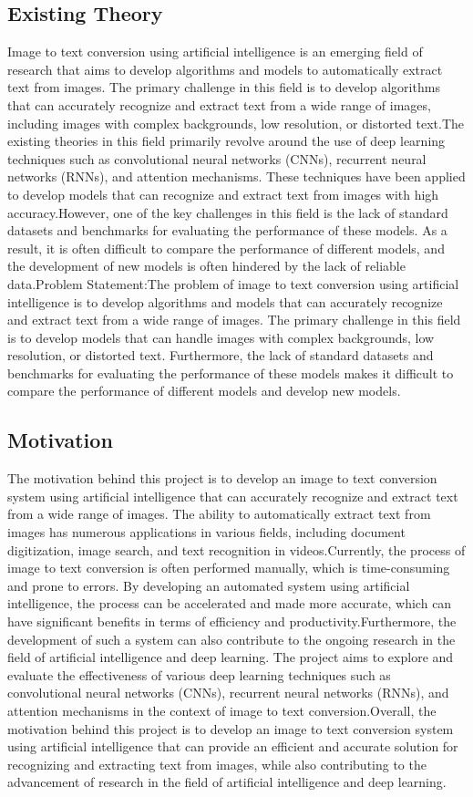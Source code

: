 \subsection{Existing Theory}
Image to text conversion using artificial intelligence is an emerging field of research that aims to develop algorithms and models to automatically extract text from images. The primary challenge in this field is to develop algorithms that can accurately recognize and extract text from a wide range of images, including images with complex backgrounds, low resolution, or distorted text.The existing theories in this field primarily revolve around the use of deep learning techniques such as convolutional neural networks (CNNs), recurrent neural networks (RNNs), and attention mechanisms. These techniques have been applied to develop models that can recognize and extract text from images with high accuracy.However, one of the key challenges in this field is the lack of standard datasets and benchmarks for evaluating the performance of these models. As a result, it is often difficult to compare the performance of different models, and the development of new models is often hindered by the lack of reliable data.Problem Statement:The problem of image to text conversion using artificial intelligence is to develop algorithms and models that can accurately recognize and extract text from a wide range of images. The primary challenge in this field is to develop models that can handle images with complex backgrounds, low resolution, or distorted text. Furthermore, the lack of standard datasets and benchmarks for evaluating the performance of these models makes it difficult to compare the performance of different models and develop new models.


\subsection{Motivation}
The motivation behind this project is to develop an image to text conversion system using artificial intelligence that can accurately recognize and extract text from a wide range of images. The ability to automatically extract text from images has numerous applications in various fields, including document digitization, image search, and text recognition in videos.Currently, the process of image to text conversion is often performed manually, which is time-consuming and prone to errors. By developing an automated system using artificial intelligence, the process can be accelerated and made more accurate, which can have significant benefits in terms of efficiency and productivity.Furthermore, the development of such a system can also contribute to the ongoing research in the field of artificial intelligence and deep learning. The project aims to explore and evaluate the effectiveness of various deep learning techniques such as convolutional neural networks (CNNs), recurrent neural networks (RNNs), and attention mechanisms in the context of image to text conversion.Overall, the motivation behind this project is to develop an image to text conversion system using artificial intelligence that can provide an efficient and accurate solution for recognizing and extracting text from images, while also contributing to the advancement of research in the field of artificial intelligence and deep learning.

